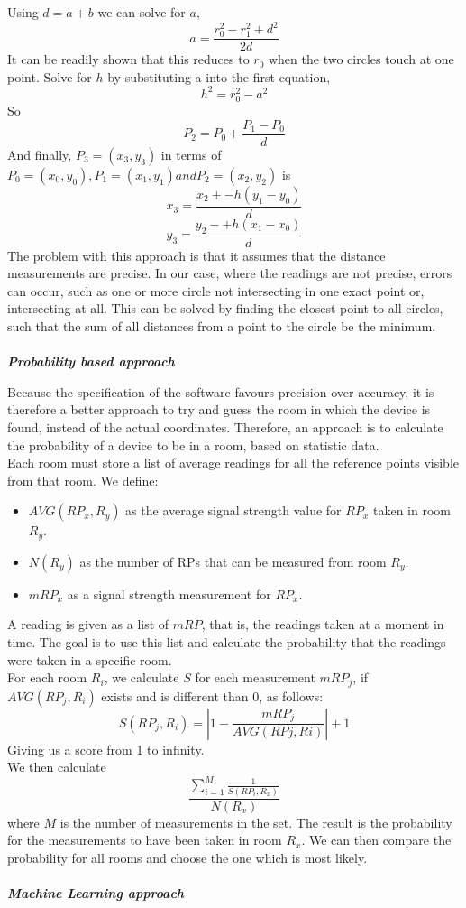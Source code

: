 \noindent Using $d = a + b$ we can solve for $a$,
$$a = \frac{r_0^2 - r_1^2 +d^2}{2d}$$
It can be readily shown that this reduces to $r_0$ when the two circles touch at one point.
Solve for $h$ by substituting a into the first equation, $$h^2 = r_0^2 - a^2$$
So $$P_2 = P_0 + \frac{P_1 - P_0}{d}$$
And finally, $P_3 = (x_3, y_3)$ in terms of $P_0 = (x_0, y_0),  P_1 = (x_1, y_1) and P_2 = (x_2, y_2)$ is $$x_3 =\frac{x_2 + -h(y_1 - y_0)}{d}$$ $$y_3 =\frac{y_2 - +h(x_1 - x_0)}{d}$$
The problem with this approach is that it assumes that the distance measurements are precise. In our case, where the readings are not precise, errors can occur, such as one or more circle not intersecting in one exact point or, intersecting at all.
This can be solved by finding the closest point to all circles, such that the sum of all distances from a point to the circle be the minimum.\\
\\
\textit{\textbf{Probability based approach}}

Because the specification of the software favours precision over accuracy, it is therefore a better approach to try and guess the room in which the device is found, instead of the actual coordinates. Therefore, an approach is to calculate the probability of a device to be in a room, based on statistic data.\\
Each room must store a list of average readings for all the reference points visible from that room. 
We define:\\
\begin{itemize}
\item $AVG(RP_x, R_y)$ as the average signal strength value for $RP_x$ taken in room $R_y$.
\item $N(R_y)$ as the number of RPs that can be measured from room $R_y$.
\item $mRP_x$ as a signal strength measurement for $RP_x$.
\end{itemize} 

A reading is given as a list of $mRP$, that is, the readings taken at a moment in time. The goal is to use this list and calculate the probability that the readings were taken in a specific room.\\
For each room $R_i$, we calculate $S$ for each measurement $mRP_j$, if $AVG(RP_j, R_i)$ exists and is different than 0, as follows:
$$S(RP_j, R_i) = | 1 - \frac{mRP_j}{AVG(RPj, Ri)}|+1$$
Giving us a score from 1 to infinity.\\
We then calculate 
$$\frac{\displaystyle\sum_{i=1}^{M} \frac{1}{S(RP_i, R_x)}}{N(R_x)}$$
where $M$ is the number of measurements in the set.
The result is the probability for the measurements to have been taken in room $R_x$.
We can then compare the probability for all rooms and choose the one which is most likely.\\
\\
\textit{\textbf{Machine Learning approach}}

